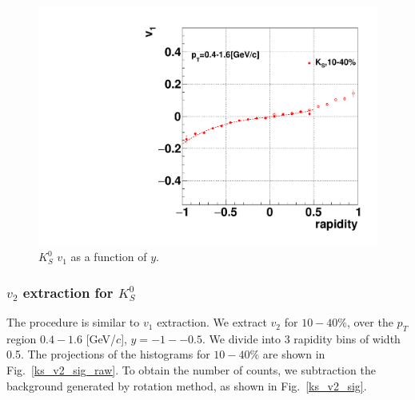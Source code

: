 \begin{figure}[h]
\includegraphics[width=0.5\linewidth]{chapterX/fig/ks_v1_sig/ks_v1vy_centall_ptbin0.pdf}
\caption{$K^0_S$ $v_1$ as a function of $y$.}
\label{ksdv1dyfit1040}
\end{figure}


\subsubsection{$v_2$ extraction for $K^0_S$}

The procedure is similar to $v_1$ extraction. We extract $v_2$ for $10-40\%$, over the $p_{T}$ region $0.4-1.6$ [GeV/$c$], $y=-1 --0.5$. We divide into 3 rapidity bins of width 0.5. The projections of the histograms for $10-40\%$ are shown in Fig.~\ref{ks_v2_sig_raw}. To obtain the number of counts, we subtraction the background generated by rotation method, as shown in Fig.~\ref{ks_v2_sig}.


